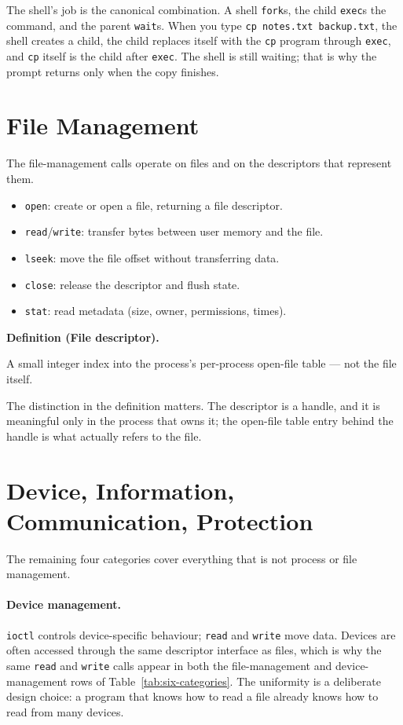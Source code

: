 \documentclass[11pt]{article}
\newenvironment{definitionbox}[1]{%
  \par\noindent\textbf{Definition (#1).}\ \itshape
}{\par\vspace{0.3em}}
\begin{document}
The shell's job is the canonical combination. A shell \texttt{fork}s, the child
\texttt{exec}s the command, and the parent \texttt{wait}s. When you type
\texttt{cp notes.txt backup.txt}, the shell creates a child, the child replaces
itself with the \texttt{cp} program through \texttt{exec}, and \texttt{cp}
itself is the child after \texttt{exec}. The shell is still waiting; that is
why the prompt returns only when the copy finishes.

\section{File Management}

The file-management calls operate on files and on the descriptors that
represent them.

\begin{itemize}
  \item \texttt{open}: create or open a file, returning a file descriptor.
  \item \texttt{read}/\texttt{write}: transfer bytes between user memory and
        the file.
  \item \texttt{lseek}: move the file offset without transferring data.
  \item \texttt{close}: release the descriptor and flush state.
  \item \texttt{stat}: read metadata (size, owner, permissions, times).
\end{itemize}

\begin{definitionbox}{File descriptor}
A small integer index into the process's per-process open-file table --- not
the file itself.
\end{definitionbox}

The distinction in the definition matters. The descriptor is a handle, and it
is meaningful only in the process that owns it; the open-file table entry
behind the handle is what actually refers to the file.

\section{Device, Information, Communication, Protection}

The remaining four categories cover everything that is not process or file
management.

\paragraph{Device management.} \texttt{ioctl} controls device-specific
behaviour; \texttt{read} and \texttt{write} move data. Devices are often
accessed through the same descriptor interface as files, which is why the same
\texttt{read} and \texttt{write} calls appear in both the file-management and
device-management rows of Table~\ref{tab:six-categories}. The uniformity is a
deliberate design choice: a program that knows how to read a file already knows
how to read from many devices.
\end{document}
